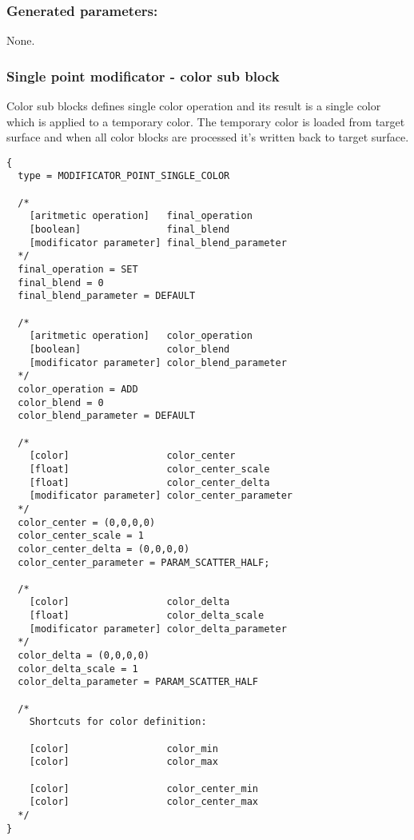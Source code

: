 \documentclass[9pt]{article}
\begin{document}
\subsubsection*{Generated parameters:}

None.

\subsubsection{Single point modificator - color sub block}

Color sub blocks defines single color operation and its result
is a single color which is applied to a temporary color. The temporary color
is loaded from target surface and when all color blocks are 
processed it's written back to target surface.
\begin{verbatim}
{
  type = MODIFICATOR_POINT_SINGLE_COLOR

  /*  
    [aritmetic operation]   final_operation
    [boolean]               final_blend
    [modificator parameter] final_blend_parameter
  */
  final_operation = SET
  final_blend = 0
  final_blend_parameter = DEFAULT
  
  /*
    [aritmetic operation]   color_operation
    [boolean]               color_blend
    [modificator parameter] color_blend_parameter
  */
  color_operation = ADD
  color_blend = 0
  color_blend_parameter = DEFAULT
  
  /*
    [color]                 color_center
    [float]                 color_center_scale
    [float]                 color_center_delta
    [modificator parameter] color_center_parameter
  */
  color_center = (0,0,0,0)
  color_center_scale = 1
  color_center_delta = (0,0,0,0)
  color_center_parameter = PARAM_SCATTER_HALF;
  
  /*
    [color]                 color_delta
    [float]                 color_delta_scale
    [modificator parameter] color_delta_parameter
  */
  color_delta = (0,0,0,0)
  color_delta_scale = 1
  color_delta_parameter = PARAM_SCATTER_HALF
  
  /*
    Shortcuts for color definition:
    
    [color]                 color_min
    [color]                 color_max

    [color]                 color_center_min
    [color]                 color_center_max
  */  
}
\end{verbatim}
\end{document}
